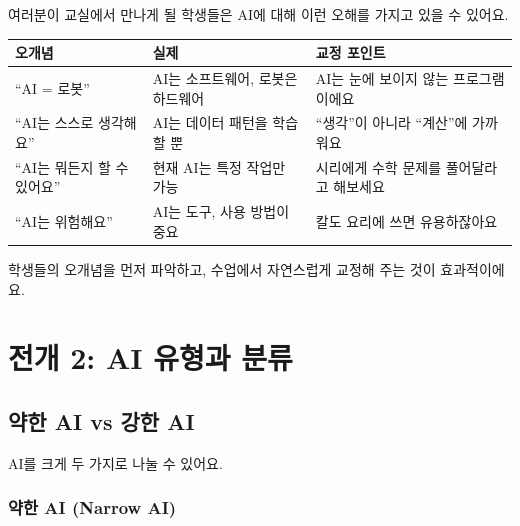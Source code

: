 \documentclass[11pt,a4paper]{article}
\begin{document}
여러분이 교실에서 만나게 될 학생들은 AI에 대해 이런 오해를 가지고 있을 수 있어요.

\begin{center}
\begin{tabular}{|p{3.5cm}|p{4cm}|p{4.5cm}|}
\hline
\rowcolor{tableheader}
\textbf{오개념} & \textbf{실제} & \textbf{교정 포인트} \\
\hline
``AI = 로봇'' & AI는 소프트웨어, 로봇은 하드웨어 & AI는 눈에 보이지 않는 프로그램이에요 \\
\hline
``AI는 스스로 생각해요'' & AI는 데이터 패턴을 학습할 뿐 & ``생각''이 아니라 ``계산''에 가까워요 \\
\hline
``AI는 뭐든지 할 수 있어요'' & 현재 AI는 특정 작업만 가능 & 시리에게 수학 문제를 풀어달라고 해보세요 \\
\hline
``AI는 위험해요'' & AI는 도구, 사용 방법이 중요 & 칼도 요리에 쓰면 유용하잖아요 \\
\hline
\end{tabular}
\end{center}

\begin{tipbox}
학생들의 오개념을 먼저 파악하고, 수업에서 자연스럽게 교정해 주는 것이 효과적이에요.
\end{tipbox}

\section{ 전개 2: AI 유형과 분류}

\subsection{약한 AI vs 강한 AI}

AI를 크게 두 가지로 나눌 수 있어요.

\subsubsection{ 약한 AI (Narrow AI)}
\end{document}
